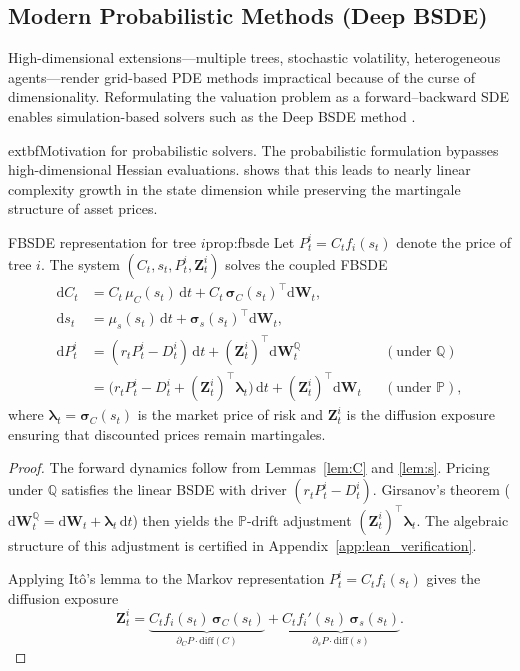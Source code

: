 ﻿\documentclass[11pt,letterpaper,oneside]{article}
\numberwithin{equation}{section}
\newcommand{\1}{\mathbf{1}}
\newcommand{\diff}{\mathrm{d}}
\begin{document}
\subsection{Modern Probabilistic Methods (Deep BSDE)}\label{sec:computation_probabilistic}
High-dimensional extensions---multiple trees, stochastic volatility, heterogeneous agents---render grid-based PDE methods impractical because of the curse of dimensionality. Reformulating the valuation problem as a forward--backward SDE enables simulation-based solvers such as the Deep BSDE method \cite{han2018solving,huang2025probabilistic}.
\begin{tcolorbox}[literaturestyle]
  	extbf{Motivation for probabilistic solvers.} The probabilistic formulation bypasses high-dimensional Hessian evaluations. \cite{huang2025probabilistic} shows that this leads to nearly linear complexity growth in the state dimension while preserving the martingale structure of asset prices.
\end{tcolorbox}
\begin{proposition}{FBSDE representation for tree $i$}{prop:fbsde}
Let $P_t^i=C_t f_i(s_t)$ denote the price of tree $i$. The system $(C_t,s_t,P_t^i,\bm{Z}_t^i)$ solves the coupled FBSDE
\begin{align*}
  \diff C_t &= C_t\,\mu_C(s_t)\,\diff t + C_t\,\bm{\sigma}_C(s_t)^{\top}\diff\bm{W}_t,\\
  \diff s_t &= \mu_s(s_t)\,\diff t + \bm{\sigma}_s(s_t)^{\top}\diff\bm{W}_t,\\
  \diff P_t^i &= (r_t P_t^i - D_t^i)\,\diff t + (\bm{Z}_t^i)^{\top}\diff\bm{W}_t^{\mathbb{Q}} && (\text{under }\mathbb{Q})\\
              &= \big(r_t P_t^i - D_t^i + (\bm{Z}_t^i)^{\top}\bm{\lambda}_t\big)\,\diff t + (\bm{Z}_t^i)^{\top}\diff\bm{W}_t && (\text{under }\mathbb{P}),
\end{align*}
where $\bm{\lambda}_t=\bm{\sigma}_C(s_t)$ is the market price of risk and $\bm{Z}_t^i$ is the diffusion exposure ensuring that discounted prices remain martingales.
\end{proposition}
\begin{proof}
The forward dynamics follow from Lemmas~\ref{lem:C} and \ref{lem:s}. Pricing under $\mathbb{Q}$ satisfies the linear BSDE with driver $(r_t P_t^i-D_t^i)$. Girsanov's theorem ($\diff\bm{W}_t^{\mathbb{Q}} = \diff\bm{W}_t + \bm{\lambda}_t\,\diff t$) then yields the $\mathbb{P}$-drift adjustment $(\bm{Z}_t^i)^{\top}\bm{\lambda}_t$. The algebraic structure of this adjustment is certified in Appendix~\ref{app:lean_verification}.

Applying It\^o's lemma to the Markov representation $P_t^i=C_t f_i(s_t)$ gives the diffusion exposure
\[
  \bm{Z}_t^i = \underbrace{C_t f_i(s_t)\,\bm{\sigma}_C(s_t)}_{\partial_C P \cdot \mathrm{diff}(C)} + \underbrace{C_t f_i'(s_t)\,\bm{\sigma}_s(s_t)}_{\partial_s P \cdot \mathrm{diff}(s)}.
\]
\end{proof}
\end{document}
